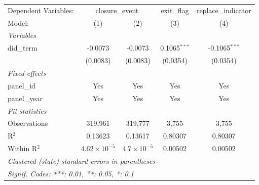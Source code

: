 
\begingroup
\centering
\begin{tabular}{lcccc}
   \tabularnewline \midrule \midrule
   Dependent Variables: & \multicolumn{2}{c}{closure\_event} & exit\_flag & replace\_indicator\\
   Model:       & (1)                   & (2)                  & (3)            & (4)\\  
   \midrule
   \emph{Variables}\\
   did\_term    & -0.0073               & -0.0073              & 0.1065$^{***}$ & -0.1065$^{***}$\\   
                & (0.0083)              & (0.0083)             & (0.0354)       & (0.0354)\\   
   \midrule
   \emph{Fixed-effects}\\
   panel\_id    & Yes                   & Yes                  & Yes            & Yes\\  
   panel\_year  & Yes                   & Yes                  & Yes            & Yes\\  
   \midrule
   \emph{Fit statistics}\\
   Observations & 319,961               & 319,777              & 3,755          & 3,755\\  
   R$^2$        & 0.13623               & 0.13617              & 0.80307        & 0.80307\\  
   Within R$^2$ & $4.62\times 10^{-5}$  & $4.7\times 10^{-5}$  & 0.00502        & 0.00502\\  
   \midrule \midrule
   \multicolumn{5}{l}{\emph{Clustered (state) standard-errors in parentheses}}\\
   \multicolumn{5}{l}{\emph{Signif. Codes: ***: 0.01, **: 0.05, *: 0.1}}\\
\end{tabular}
\par\endgroup



